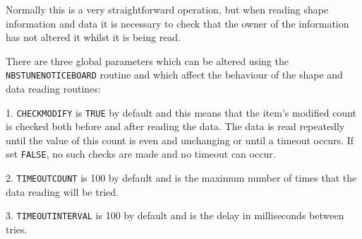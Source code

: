 \documentclass[twoside,11pt]{article}
\renewcommand{\_}{\texttt{\symbol{95}}}
\newcommand{\mantt}{\tt}
\begin{document}
      Normally this is a very straightforward operation, but when reading
      shape information and data it is necessary to check that the owner of
      the information has not altered it whilst it is being read.

      There are three global parameters which can be altered using the
      {\mantt{NBS\_TUNE\_NOTICEBOARD}} routine and which affect the behaviour %
of the
      shape and data reading routines:

      1. {\mantt{CHECK\_MODIFY}} is {\mantt{TRUE}} by default and this means %
that the item's
         modified count is checked both before and after reading the data. The
         data is read repeatedly until the value of this count is even and
         unchanging or until a timeout occurs. If set {\mantt{FALSE}}, no %
such checks are
         made and no timeout can occur.

      2. {\mantt{TIMEOUT\_COUNT}} is 100 by default and is the maximum number %
of times
         that the data reading will be tried.

      3. {\mantt{TIMEOUT\_INTERVAL}} is 100 by default and is the delay in %
milliseconds
         between tries.
\end{document}
